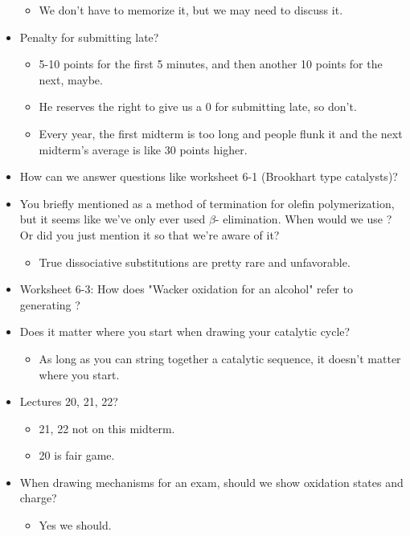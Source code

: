 \documentclass[../notes.tex]{subfiles}
\begin{document}
\begin{itemize}
    \begin{itemize}
        \item We don't have to memorize it, but we may need to discuss it.
    \end{itemize}
    \item Penalty for submitting late?
    \begin{itemize}
        \item 5-10 points for the first 5 minutes, and then another 10 points for the next, maybe.
        \item He reserves the right to give us a 0 for submitting late, so don't.
        \item Every year, the first midterm is too long and people flunk it and the next midterm's average is like 30 points higher.
    \end{itemize}
    \item How can we answer questions like worksheet 6-1 (Brookhart type catalysts)?
    \item You briefly mentioned  as a method of termination for olefin polymerization, but it seems like we've only ever used $\beta$- elimination. When would we use ? Or did you just mention it so that we're aware of it?
    \begin{itemize}
        \item True dissociative substitutions are pretty rare and unfavorable.
    \end{itemize}
    \item Worksheet 6-3: How does "Wacker oxidation for an alcohol" refer to generating ?
    \item Does it matter where you start when drawing your catalytic cycle?
    \begin{itemize}
        \item As long as you can string together a catalytic sequence, it doesn't matter where you start.
    \end{itemize}
    \item Lectures 20, 21, 22?
    \begin{itemize}
        \item 21, 22 not on this midterm.
        \item 20 is fair game.
    \end{itemize}
    \item When drawing mechanisms for an exam, should we show oxidation states and charge?
    \begin{itemize}
        \item Yes we should.

\end{itemize}
\end{itemize}
\end{document}
